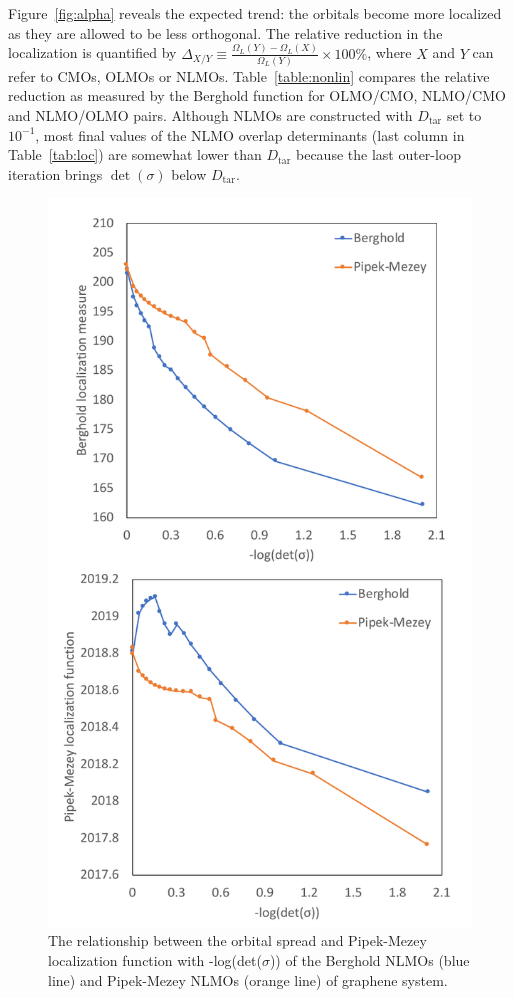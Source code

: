 \documentclass[aps,prl,reprint,amsmath,amssymb]{revtex4-1}
\begin{document}
Figure~\ref{fig:alpha} reveals the expected trend: the orbitals become more localized as they are allowed to be less orthogonal. 
The relative reduction in the localization is quantified by $\Delta_{X/Y} \equiv \frac{\Omega_L(Y)-\Omega_L(X)}{\Omega_L(Y)} \times 100 \%$, where $X$ and $Y$ can refer to CMOs, OLMOs or NLMOs.
Table~\ref{table:nonlin} compares the relative reduction as measured by the Berghold function for OLMO/CMO, NLMO/CMO and NLMO/OLMO pairs. Although NLMOs are constructed with $D_{\text{tar}}$ set to $10^{-1}$, most final values of the NLMO overlap determinants (last column in Table~\ref{tab:loc}) are somewhat lower than $D_{\text{tar}}$ because the last outer-loop iteration brings $\det(\sigma)$ below $D_{\text{tar}}$. %
%
\begin{figure}[htbp]
\centering
\includegraphics[scale=0.55]{orbital_spread.pdf}
\caption{The relationship between the orbital spread and Pipek-Mezey localization function with -log(det($\sigma$)) of the Berghold NLMOs (blue line) and Pipek-Mezey NLMOs (orange line) of graphene system.}
\label{fig:orbital_spread}
\end{figure}
\end{document}
